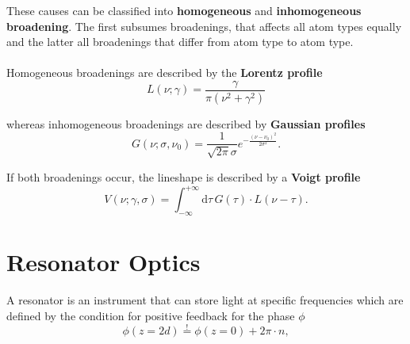 \documentclass{article}
\newcommand{\diff}{\mathrm{d}}
\newcommand{\lr}[1]{\left(#1\right)}
\begin{document}
These causes can be classified into \textbf{homogeneous} and \textbf{inhomogeneous broadening}. The first subsumes broadenings, that affects all atom types equally and the latter all broadenings that differ from atom type to atom type.\\
\\
Homogeneous broadenings are described by the \textbf{Lorentz profile}
	\begin{equation}
		L(\nu; \gamma) = \frac{\gamma}{\pi \lr{ \nu^2 + \gamma^2 }}
	\end{equation}

whereas inhomogeneous broadenings are described by \textbf{Gaussian profiles}
	\begin{equation}
		G(\nu; \sigma, \nu_0) = \frac{1}{\sqrt{2\pi} \sigma} e^{- \frac{ (\nu - \nu_0)^2 }{ 2\sigma^2 } }.
	\end{equation}

If both broadenings occur, the lineshape is described by a \textbf{Voigt profile}
	\begin{equation}
		V(\nu; \gamma, \sigma) = \int_{-\infty}^{+\infty} \diff \tau \, G(\tau) \cdot L(\nu - \tau).
	\end{equation}


\newpage


\section{Resonator Optics}
A resonator is an instrument that can store light at specific frequencies which are defined by the condition for positive feedback for the phase $\phi$
	\begin{equation}
		\phi(z=2d) \stackrel{!}{=} \phi(z=0) + 2\pi \cdot n,
	\end{equation}
\end{document}
